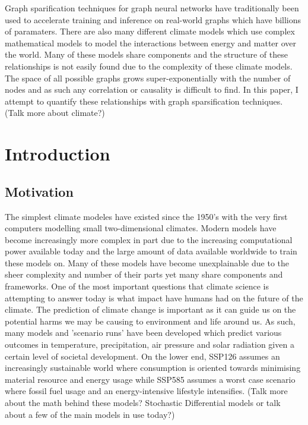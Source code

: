 \documentclass[honours,12pt]{unswthesis}
\newcommand\blankpage{%
    \null
    \thispagestyle{empty}%
    \addtocounter{page}{-1}%
    \newpage}
\numberwithin{equation}{section}
\begin{document}
\afterpage{\blankpage}



Graph sparification techniques for graph neural networks have traditionally been used to 
accelerate training and inference on real-world graphs which have billions of paramaters.
There are also many different climate models which use complex mathematical models to model 
the interactions between energy and matter over the world. Many of these models share 
components and the structure of these relationships is not easily found due to the complexity of
these climate models. The space of all possible graphs grows super-exponentially with the number 
of nodes and as such any correlation or causality is difficult to find. In this paper, I attempt 
to quantify these relationships with graph sparsification techniques.
(Talk more about climate?)
\afterpage{\blankpage}


\afterpreface

%
%

\afterpage{\blankpage}

\chapter{Introduction}\label{s-intro}

{\section{Motivation}}\label{motivation}

{\noindent} The simplest climate modeles have existed since the 1950's with the very first computers modelling small two-dimensional climates. 
Modern models have become increasingly more complex in part due to the increasing computational power available today and the large amount of data available
worldwide to train these models on. Many of these models have become unexplainable due to the sheer complexity and number of their parts yet many share components
and frameworks. One of the most important questions that climate science is attempting to answer today is what impact have humans had on the future of the climate.
The prediction of climate change is important as it can guide us on the potential harms we may be causing to environment and life around us. As such, many models
and 'scenario runs' have been developed which predict various outcomes in temperature, precipitation, air pressure and solar radiation given a certain level of 
societal development. On the lower end, SSP126 assumes an increasingly sustainable world where consumption is oriented towards minimising material resource and energy usage
while SSP585 assumes a worst case scenario where fossil fuel usage and an energy-intensive lifestyle intensifies.
(Talk more about the math behind these models? Stochastic Differential models or talk about a few of the main models in use today?)
\end{document}
